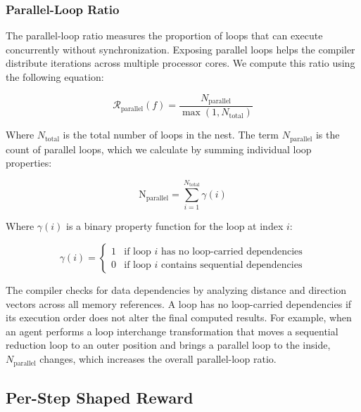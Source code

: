 \subsubsection{Parallel-Loop Ratio}
The parallel-loop ratio measures the proportion of loops that can execute concurrently without synchronization. Exposing parallel loops helps the compiler distribute iterations across multiple processor cores. We compute this ratio using the following equation:

\begin{equation}
    \mathcal{R}_{\text{parallel}}(f) = \frac{N_{\text{parallel}}}{\max(1, N_{\text{total}})}
    \label{eq:parallel-ratio}
\end{equation}

Where $N_{\text{total}}$ is the total number of loops in the nest. The term $N_{\text{parallel}}$ is the count of parallel loops, which we calculate by summing individual loop properties:

\begin{equation}
    \text{N}_{\text{parallel}} = \sum_{i=1}^{N_{\text{total}}} \gamma(i)
    \label{eq:count-parallel}
\end{equation}

Where $\gamma(i)$ is a binary property function for the loop at index $i$:

\begin{equation}
    \gamma(i) = \begin{cases}
        1 & \text{if loop } i \text{ has no loop-carried dependencies} \\
        0 & \text{if loop } i \text{ contains sequential dependencies}
    \end{cases}
    \label{eq:loop-parallel-check}
\end{equation}

The compiler checks for data dependencies by analyzing distance and direction vectors across all memory references. A loop has no loop-carried dependencies if its execution order does not alter the final computed results. For example, when an agent performs a loop interchange transformation that moves a sequential reduction loop to an outer position and brings a parallel loop to the inside, $N_{\text{parallel}}$ changes, which increases the overall parallel-loop ratio.

\subsection{Per-Step Shaped Reward}

